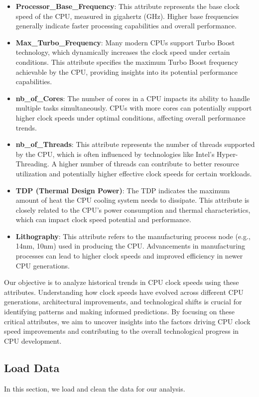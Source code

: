 \begin{itemize}
    \item \textbf{Processor\_Base\_Frequency}: This attribute represents the base clock speed of the CPU, measured in gigahertz (GHz). Higher base frequencies generally indicate faster processing capabilities and overall performance.
    \item \textbf{Max\_Turbo\_Frequency}: Many modern CPUs support Turbo Boost technology, which dynamically increases the clock speed under certain conditions. This attribute specifies the maximum Turbo Boost frequency achievable by the CPU, providing insights into its potential performance capabilities.
    \item \textbf{nb\_of\_Cores}: The number of cores in a CPU impacts its ability to handle multiple tasks simultaneously. CPUs with more cores can potentially support higher clock speeds under optimal conditions, affecting overall performance trends.
    \item \textbf{nb\_of\_Threads}: This attribute represents the number of threads supported by the CPU, which is often influenced by technologies like Intel's Hyper-Threading. A higher number of threads can contribute to better resource utilization and potentially higher effective clock speeds for certain workloads.
    \item \textbf{TDP (Thermal Design Power)}: The TDP indicates the maximum amount of heat the CPU cooling system needs to dissipate. This attribute is closely related to the CPU's power consumption and thermal characteristics, which can impact clock speed potential and performance.
    \item \textbf{Lithography}: This attribute refers to the manufacturing process node (e.g., 14nm, 10nm) used in producing the CPU. Advancements in manufacturing processes can lead to higher clock speeds and improved efficiency in newer CPU generations.
\end{itemize}

Our objective is to analyze historical trends in CPU clock speeds using these attributes. Understanding how clock speeds have evolved across different CPU generations, architectural improvements, and technological shifts is crucial for identifying patterns and making informed predictions. By focusing on these critical attributes, we aim to uncover insights into the factors driving CPU clock speed improvements and contributing to the overall technological progress in CPU development.

\subsection{Load Data}
In this section, we load and clean the data for our analysis.

